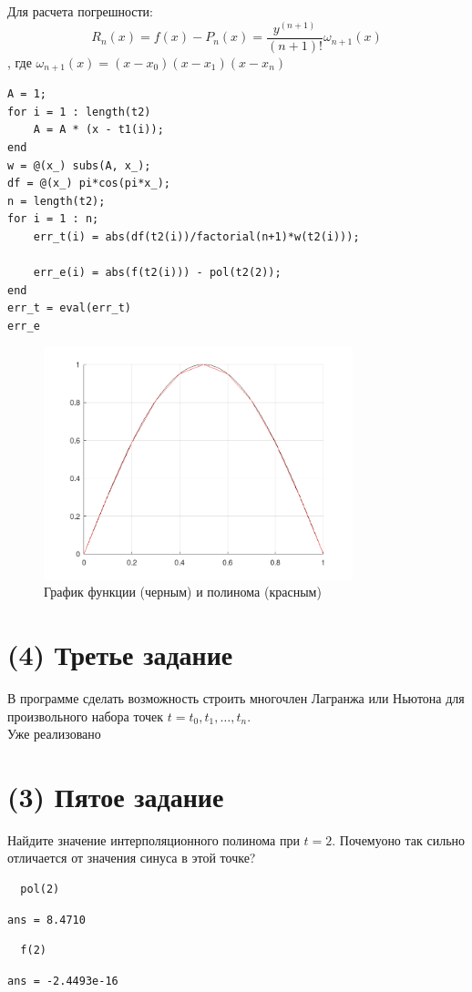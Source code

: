 Для расчета погрешности:
\[
  R_{n}(x) = f(x)-P_{n}(x) = \frac{y^{(n+1)}}{(n+1)!}\omega_{n+1}(x)
\]
, где $\omega_{n+1}(x) = (x-x_{0})(x-x_{1})(x-x_{n})$
\begin{lstlisting}
A = 1;
for i = 1 : length(t2)
	A = A * (x - t1(i));
end
w = @(x_) subs(A, x_);
df = @(x_) pi*cos(pi*x_);
n = length(t2);
for i = 1 : n;
	err_t(i) = abs(df(t2(i))/factorial(n+1)*w(t2(i)));

	err_e(i) = abs(f(t2(i))) - pol(t2(2));
end
err_t = eval(err_t)
err_e
\end{lstlisting}
\begin{figure}[h]
  \caption{График функции (черным) и полинома (красным)}
  \label{fig:plot_2}
  \centering
  \includegraphics[width=0.8\textwidth]{images/second_task_2.png}
\end{figure}

\section{(4) Третье задание}
В программе сделать возможность строить многочлен Лагранжа или Ньютона для произвольного набора точек $t = t_{0}, t_{1}, \ldots, t_{n}$.\\[2mm]
Уже реализовано

\section{(3) Пятое задание}
Найдите значение интерполяционного полинома при $t = 2$. Почемуоно так сильно отличается от значения синуса в этой точке?\\[2mm]
\begin{lstlisting}
  pol(2)
\end{lstlisting}

\begin{lstlisting}[backgroundcolor=\color{cyan}]
  ans = 8.4710
\end{lstlisting}

\begin{lstlisting}
  f(2)
\end{lstlisting}

\begin{lstlisting}[backgroundcolor=\color{cyan}]
  ans = -2.4493e-16
\end{lstlisting}
